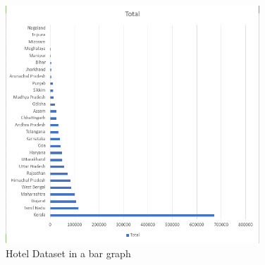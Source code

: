 \documentclass{report}
\begin{document}
\begin{Center}
  \begin{figure}[h!]
    \includegraphics[width=0.85\textwidth]{Hotel_BarGraph.png}
    \caption{Hotel Dataset in a bar graph}
   \end{figure}
\end{Center}
\newpage 
\end{document}
